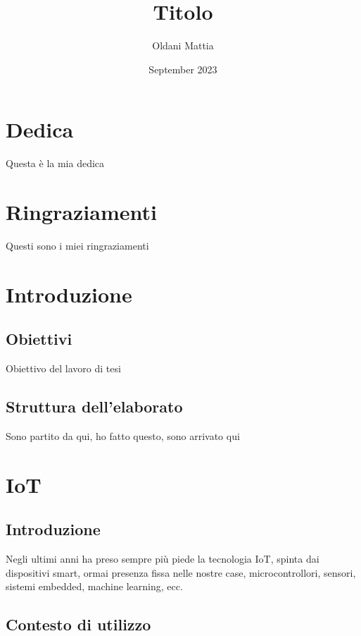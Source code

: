 \documentclass{report}
\title{Titolo}
\author{Oldani Mattia}
\date{September 2023}
\begin{document}
\maketitle

\chapter*{Dedica}

Questa è la mia dedica

\newpage

\chapter*{Ringraziamenti}

Questi sono i miei ringraziamenti

\tableofcontents
\newpage

\chapter{Introduzione}

\section{Obiettivi}

Obiettivo del lavoro di tesi

\section{Struttura dell'elaborato}

Sono partito da qui, ho fatto questo, sono arrivato qui

\newpage

\chapter{IoT}

\section{Introduzione}

Negli ultimi anni ha preso sempre più piede la tecnologia IoT, spinta dai dispositivi smart, ormai presenza fissa nelle nostre case, microcontrollori, sensori, sistemi embedded, machine learning, ecc.

\section{Contesto di utilizzo}
\end{document}
